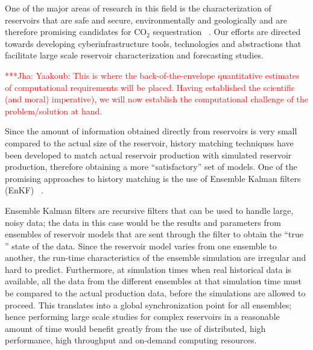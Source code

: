 \documentclass{rspublic}
\newcommand{\jhanote}[1]{ {\textcolor{red} { ***Jha: #1 }}}
\newcommand{\jhanote}[1]{}
\begin{document}
One of the major areas of research in this field is the
characterization of reservoirs that are safe and secure,
environmentally and geologically and are therefore promising
candidates for CO$_2$ sequestration ~\citep{GeoRPT,Luigi}. Our efforts
are directed towards developing cyberinfrastructure tools,
technologies and abstractions that facilitate large scale reservoir
characterization and forecasting studies.

\jhanote{Yaakoub: This is where the back-of-the-envelope quantitative
  estimates of computational requirements will be placed. Having
  established the scientific (and moral) imperative), we will now
  establish the computational challenge of the problem/solution at
  hand.}

Since the amount of information obtained directly from reservoirs is
very small compared to the actual size of the reservoir, history
matching techniques have been developed to match actual reservoir
production with simulated reservoir production, therefore obtaining a
more ``satisfactory'' set of models. One of the promising approaches
to history matching is the use of Ensemble Kalman filters (EnKF)
~\citep{KalmanPaper, DO2007, LiEnKF07, DO2006}.

Ensemble Kalman filters are recursive filters that can be used to
handle large, noisy data; the data in this case would be the results
and parameters from ensembles of reservoir models that are sent
through the filter to obtain the ``true '' state of the data. Since
the reservoir model varies from one ensemble to another, the run-time
characteristics of the ensemble simulation are irregular and hard to
predict. Furthermore, at simulation times when real historical data is
available, all the data from the different ensembles at that
simulation time must be compared to the actual production data, before
the simulations are allowed to proceed. This translates into a global
synchronization point for all ensembles; hence performing large scale
studies for complex reservoirs in a reasonable amount of time would
benefit greatly from the use of distributed, high performance, high
throughput and on-demand computing resources.
\end{document}

